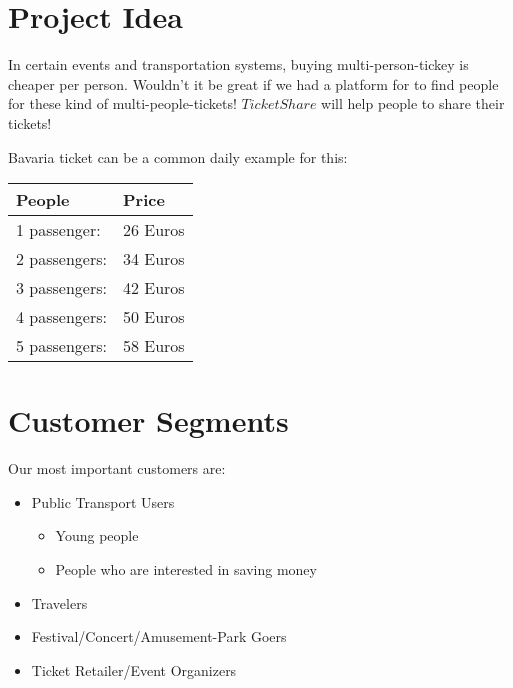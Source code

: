 \documentclass{article}
\begin{document}

\newpage

\section{Project Idea}

In certain events and transportation systems, buying multi-person-tickey is cheaper per person. Wouldn't it be great if we had a platform for to find people for these kind of multi-people-tickets! $TicketShare$ will help people to share their tickets!

Bavaria ticket can be a common daily example for this:

\begin{table}[h]
\centering
\begin{tabular}{|l|l|}
\hline
\textbf{People} & \textbf{Price} \\ \hline
1 passenger:    & 26 Euros          \\ \hline
2 passengers:   & 34 Euros           \\ \hline
3 passengers:   & 42 Euros           \\ \hline
4 passengers:   & 50 Euros           \\ \hline
5 passengers:   & 58 Euros           \\ \hline
\end{tabular}
\end{table}

\vspace{-5mm}
\section{Customer Segments}
Our most important customers are:

\begin{itemize}
    \item Public Transport Users
        \begin{itemize}
            \item Young people
            \item People who are interested in saving money
        \end{itemize}
    \item Travelers
    \item Festival/Concert/Amusement-Park Goers
    \item Ticket Retailer/Event Organizers
\end{itemize}
\end{document}
